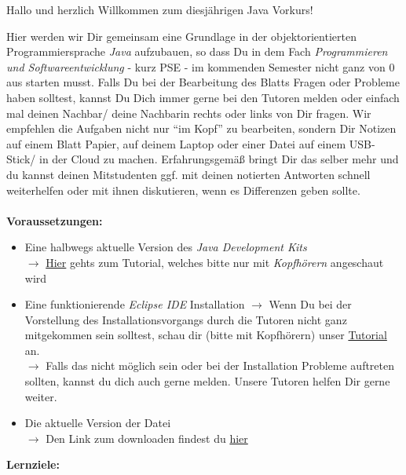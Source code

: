 
\begin{center}
	Hallo und herzlich Willkommen zum diesjährigen Java Vorkurs!\\
\end{center}
Hier werden wir Dir gemeinsam eine Grundlage in der objektorientierten Programmiersprache \textit{Java} aufzubauen, so dass Du in dem Fach \textit{Programmieren und Softwareentwicklung} - kurz PSE - im kommenden Semester nicht ganz von 0 aus starten musst.\newline
Falls Du bei der Bearbeitung des Blatts Fragen oder Probleme haben solltest, kannst Du Dich immer gerne bei den Tutoren melden oder einfach mal deinen Nachbar/ deine Nachbarin rechts oder links von Dir fragen.\newline
Wir empfehlen die Aufgaben nicht nur \enquote{im Kopf} zu bearbeiten, sondern Dir Notizen auf einem Blatt Papier, auf deinem Laptop oder einer Datei auf einem USB-Stick/ in der Cloud zu machen. Erfahrungsgemäß bringt Dir das selber mehr und du kannst deinen Mitstudenten ggf. mit deinen notierten Antworten schnell weiterhelfen oder mit ihnen diskutieren, wenn es Differenzen geben sollte.\\\\
\textbf{Voraussetzungen:}
\begin{itemize}
	\item Eine halbwegs aktuelle Version des \textit{Java Development Kits}\\
	$\rightarrow$ \href{\jdkTutorial}{Hier} gehts zum Tutorial, welches bitte nur mit \textit{Kopfhörern} angeschaut wird
	\item Eine funktionierende \textit{Eclipse IDE} Installation\newline
	$\rightarrow$ Wenn Du bei der Vorstellung des Installationsvorgangs durch die Tutoren nicht ganz mitgekommen sein solltest, schau dir (bitte mit Kopfhörern) unser \href{\eclipseTutorial}{Tutorial} an.\\
	$\rightarrow$ Falls das nicht möglich sein oder bei der Installation Probleme auftreten sollten, kannst du dich auch gerne melden. Unsere Tutoren helfen Dir gerne weiter.
	\item Die aktuelle Version der \texttt{\jvkpackage} Datei\\
	$\rightarrow$ Den Link zum downloaden findest du \href{\jvkpackageurl}{hier}
\end{itemize}
\textbf{Lernziele:}
